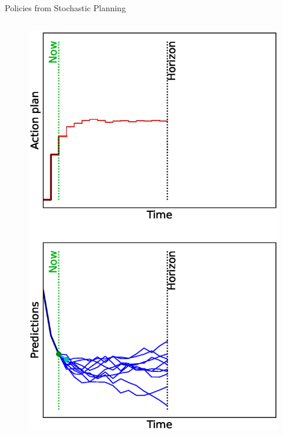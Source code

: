 \documentclass[lecture]{beamer}
\begin{document}
\begin{frame}{\normalsize Policies from Stochastic Planning}
\begin{columns}
\begin{overlayarea}{\textwidth}{0.9\textheight}
\begin{figure}
{          \includegraphics[width=\FS\textwidth,clip]{Codes/MPC/MPCMC2.eps}
        }%
        {%
}
\end{figure}
\end{overlayarea}
\end{columns}
\end{frame}
\end{document}

